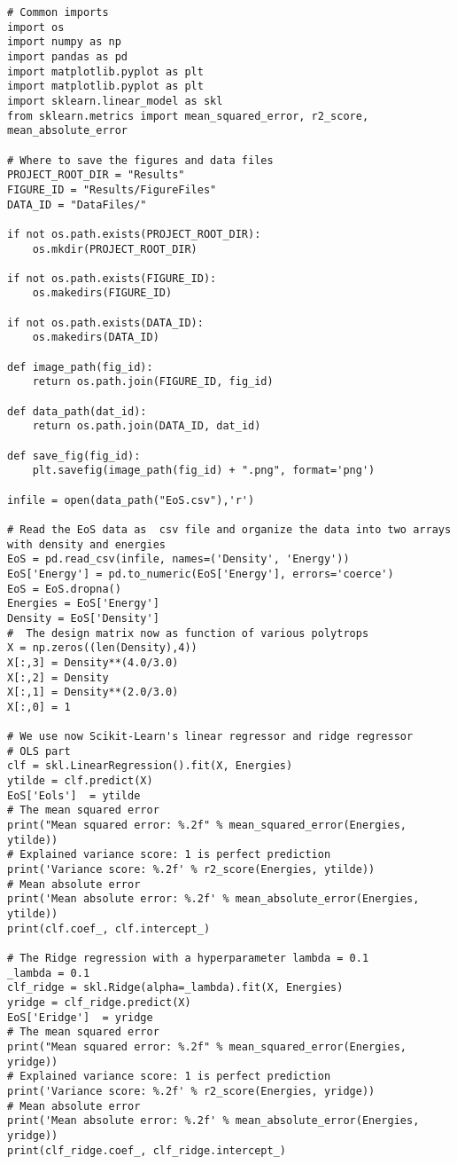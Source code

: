 \documentclass[%
oneside,                 %
final,                   %
10pt]{article}
\begin{document}
\begin{verbatim}
# Common imports
import os
import numpy as np
import pandas as pd
import matplotlib.pyplot as plt
import matplotlib.pyplot as plt
import sklearn.linear_model as skl
from sklearn.metrics import mean_squared_error, r2_score, mean_absolute_error

# Where to save the figures and data files
PROJECT_ROOT_DIR = "Results"
FIGURE_ID = "Results/FigureFiles"
DATA_ID = "DataFiles/"

if not os.path.exists(PROJECT_ROOT_DIR):
    os.mkdir(PROJECT_ROOT_DIR)

if not os.path.exists(FIGURE_ID):
    os.makedirs(FIGURE_ID)

if not os.path.exists(DATA_ID):
    os.makedirs(DATA_ID)

def image_path(fig_id):
    return os.path.join(FIGURE_ID, fig_id)

def data_path(dat_id):
    return os.path.join(DATA_ID, dat_id)

def save_fig(fig_id):
    plt.savefig(image_path(fig_id) + ".png", format='png')

infile = open(data_path("EoS.csv"),'r')

# Read the EoS data as  csv file and organize the data into two arrays with density and energies
EoS = pd.read_csv(infile, names=('Density', 'Energy'))
EoS['Energy'] = pd.to_numeric(EoS['Energy'], errors='coerce')
EoS = EoS.dropna()
Energies = EoS['Energy']
Density = EoS['Density']
#  The design matrix now as function of various polytrops
X = np.zeros((len(Density),4))
X[:,3] = Density**(4.0/3.0)
X[:,2] = Density
X[:,1] = Density**(2.0/3.0)
X[:,0] = 1

# We use now Scikit-Learn's linear regressor and ridge regressor
# OLS part
clf = skl.LinearRegression().fit(X, Energies)
ytilde = clf.predict(X)
EoS['Eols']  = ytilde
# The mean squared error                               
print("Mean squared error: %.2f" % mean_squared_error(Energies, ytilde))
# Explained variance score: 1 is perfect prediction                                 
print('Variance score: %.2f' % r2_score(Energies, ytilde))
# Mean absolute error                                                           
print('Mean absolute error: %.2f' % mean_absolute_error(Energies, ytilde))
print(clf.coef_, clf.intercept_)

# The Ridge regression with a hyperparameter lambda = 0.1
_lambda = 0.1
clf_ridge = skl.Ridge(alpha=_lambda).fit(X, Energies)
yridge = clf_ridge.predict(X)
EoS['Eridge']  = yridge
# The mean squared error                               
print("Mean squared error: %.2f" % mean_squared_error(Energies, yridge))
# Explained variance score: 1 is perfect prediction                                 
print('Variance score: %.2f' % r2_score(Energies, yridge))
# Mean absolute error                                                           
print('Mean absolute error: %.2f' % mean_absolute_error(Energies, yridge))
print(clf_ridge.coef_, clf_ridge.intercept_)


\end{verbatim}
\end{document}
